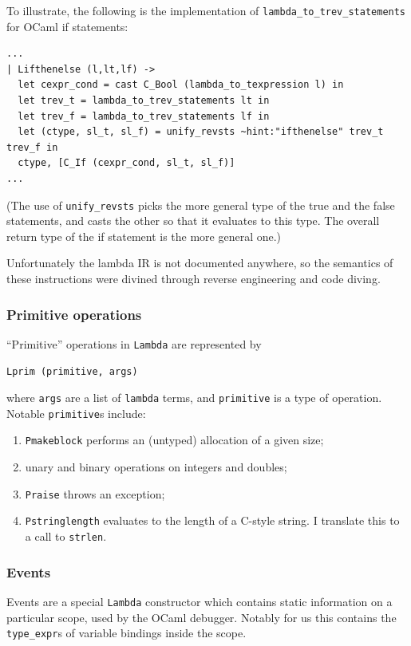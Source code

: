 \documentclass[12pt,a4paper,twoside,openright]{report}
\begin{document}
To illustrate, the following is the implementation of
\lstinline!lambda_to_trev_statements! for OCaml if statements:
\begin{lstlisting}
...
| Lifthenelse (l,lt,lf) ->
  let cexpr_cond = cast C_Bool (lambda_to_texpression l) in
  let trev_t = lambda_to_trev_statements lt in
  let trev_f = lambda_to_trev_statements lf in
  let (ctype, sl_t, sl_f) = unify_revsts ~hint:"ifthenelse" trev_t trev_f in
  ctype, [C_If (cexpr_cond, sl_t, sl_f)]
...\end{lstlisting}

(The use of \lstinline!unify_revsts! picks the more general type of the true
and the false statements, and casts the other so that it evaluates to this type.
The overall return type of the if statement is the more general one.)

Unfortunately the lambda IR is not documented anywhere, so the semantics
of these instructions were divined through reverse engineering and code diving.

\subsubsection{Primitive operations}

``Primitive'' operations in \lstinline!Lambda! are represented by
\begin{lstlisting}
Lprim (primitive, args)\end{lstlisting}
where \lstinline!args! are a list of \lstinline!lambda! terms, and \lstinline!primitive! is a type of operation. Notable \lstinline!primitive!s include:
\begin{enumerate}
  \item \lstinline!Pmakeblock! performs an (untyped) allocation of a given size;
  \item unary and binary operations on integers and doubles;
  \item \lstinline!Praise! throws an exception;
  \item \lstinline!Pstringlength! evaluates to the length of a C-style string. I translate this to a call to \lstinline!strlen!.
\end{enumerate}

\subsubsection{Events}

Events are a special \lstinline!Lambda! constructor which contains static
information on a particular scope, used by the OCaml debugger. Notably for us
this contains the \lstinline!type_expr!s of variable bindings inside the scope.
\end{document}

